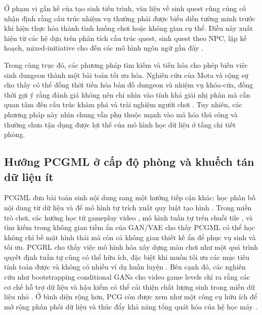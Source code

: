 \documentclass[oneside,a4paper,12pt]{extreport}
\begin{document}
Ở phạm vi gần kề của tạo sinh tiến trình, văn liệu về sinh quest cũng củng cố nhận định rằng cấu trúc nhiệm vụ thường phải được biểu diễn tường minh trước khi hiện thực hóa thành tình huống chơi hoặc không gian cụ thể. Điều này xuất hiện từ các hệ dựa trên phân tích cấu trúc quest, sinh quest theo NPC, lập kế hoạch, mixed-initiative cho đến các mô hình ngôn ngữ gần đây \cite{doran2011questgen,jeong2014npcquest,breault2021conan,alnassar2021questgram,alnassar2023questville,prins2023storyworld,lima2019questga,lima2022branching}.

Trong cùng trục đó, các phương pháp tìm kiếm và tiến hóa cho phép biến việc sinh dungeon thành một bài toán tối ưu hóa. Nghiên cứu của Mota và cộng sự cho thấy có thể đồng thời tiến hóa bản đồ dungeon và nhiệm vụ khóa-cửa, đồng thời gợi ý rằng đánh giá không nên chỉ nhìn vào tính khả giải nhị phân mà cần quan tâm đến cấu trúc khám phá và trải nghiệm người chơi \cite{mota2021dungeon}. Tuy nhiên, các phương pháp này nhìn chung vẫn phụ thuộc mạnh vào mã hóa thủ công và thường chưa tận dụng được lợi thế của mô hình học dữ liệu ở tầng chi tiết phòng.

\subsection{Hướng PCGML ở cấp độ phòng và khuếch tán dữ liệu ít}
PCGML đưa bài toán sinh nội dung sang một hướng tiếp cận khác: học phân bố nội dung từ dữ liệu và để mô hình tự trích xuất quy luật tạo hình \cite{summerville2018pcgml}. Trong miền trò chơi, các hướng học từ gameplay video \cite{guzdial2016towardgameplayvideos,guzdial2016gameplayvideos}, mô hình tuần tự trên chuỗi tile \cite{summerville2016mariostring}, và tìm kiếm trong không gian tiềm ẩn của GAN/VAE \cite{volz2018mariogan,sarkar2021blendelites} cho thấy PCGML có thể học không chỉ bề mặt hình thái mà còn cả không gian thiết kế ẩn để phục vụ sinh và tối ưu. PCGRL cho thấy việc mô hình hóa xây dựng màn chơi như một quá trình quyết định tuần tự cũng có thể hữu ích, đặc biệt khi muốn tối ưu các mục tiêu tính toán được và không có nhiều ví dụ huấn luyện \cite{khalifa2020pcgrl}. Bên cạnh đó, các nghiên cứu như bootstrapping conditional GANs cho video game levels chỉ ra rằng các cơ chế hỗ trợ dữ liệu và hậu kiểm có thể cải thiện chất lượng sinh trong miền dữ liệu nhỏ \cite{rodriguez2019bootstrapping}. Ở bình diện rộng hơn, PCG còn được xem như một công cụ hữu ích để mở rộng phân phối dữ liệu và thúc đẩy khả năng tổng quát hóa của hệ học máy \cite{risi2020generality}.
\end{document}
